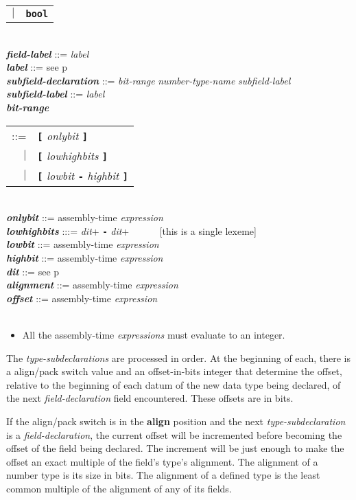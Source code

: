 \documentclass[12pt]{article}
\newcommand{\TT}[1]{{\tt \bfseries #1}}
\newcommand{\key}[1]{{\rm \bfseries #1}}
\newcommand{\ttkey}[1]{{\tt \bfseries #1}}
\newcommand{\emkey}[1]{{\em \bfseries #1}}
\newcommand{\pagref}[1]{p\pageref{#1}}
\newenvironment{indpar}[1][0.3in]%
	{\begin{list}{}%
		     {\setlength{\itemsep}{0in}%
		      \setlength{\topsep}{0in}%
		      \setlength{\parsep}{1ex}%
		      \setlength{\labelwidth}{#1}%
		      \setlength{\leftmargin}{#1}%
		      \addtolength{\leftmargin}{\labelsep}}%
	 \item}%
	{\end{list}}
\begin{document}
\begin{indpar}
\begin{tabular}[t]{@{}rl}
    $|$ &  \ttkey{bool}
    \end{tabular}
\\[2ex]
\emkey{field-label} ::=  {\em label} \\
\emkey{label} ::=  see \pagref{LABEL}
\\[2ex]
\emkey{subfield-declaration}
    ::= {\em bit-range} {\em number-type-name} {\em subfield-label} \\
\emkey{subfield-label} ::=  {\em label}
\\[2ex]
\emkey{bit-range}
    \begin{tabular}[t]{@{}rl}
    ::= &  \TT{[} {\em onlybit} \TT{]} \\
    $|$ &  \TT{[} {\em lowhighbits} \TT{]} \\
    $|$ &  \TT{[} {\em lowbit} \TT{-} {\em highbit} \TT{]}
    \end{tabular} \\
\emkey{onlybit} ::= assembly-time {\em expression} \\
\emkey{lowhighbits} :::= {\em dit}+ \TT{-} {\em dit}+
           ~~~~~ [this is a single lexeme] \\
\emkey{lowbit} ::= assembly-time {\em expression} \\
\emkey{highbit} ::= assembly-time {\em expression} \\
\emkey{dit} ::= see \pagref{DIT}
\\[2ex]
\emkey{alignment} ::= assembly-time {\em expression} \\
\emkey{offset} ::= assembly-time {\em expression} \\
\\[2ex]
\begin{itemize}
\item All the assembly-time {\em expressions} must evaluate to an integer.
\end{itemize}
\end{indpar}

The {\em type-subdeclarations} are processed in order.  At the
beginning of each, there is a align/pack switch value and an
offset-in-bits integer that determine the offset, relative to the
beginning of each datum of the new data type being declared, of the next
{\em field-declaration} field encountered.  These offsets are in bits.

If the align/pack switch is in the \key{align} position and the
next {\em type-subdeclaration} is a {\em field-declaration}, the
current offset will be incremented before becoming the offset
of the field being declared.  The increment will be just enough
to make the offset an exact multiple of the field's type's alignment.
The alignment of a number type is its size in bits.  The alignment
of a defined type is the least common multiple of the alignment of
any of its fields.
\end{document}
